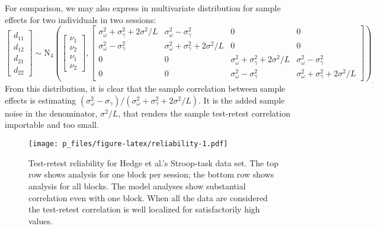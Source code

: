 \documentclass[english,man]{apa6}
\theoremstyle{definition}
\theoremstyle{definition}
\theoremstyle{definition}
\theoremstyle{remark}
\begin{document}
For comparison, we may also express in multivariate distribution for
sample effects for two individuals in two sessions: \[
\begin{bmatrix} d_{11} \\ d_{12} \\ d_{21} \\ d_{22} \end{bmatrix}
\sim \mbox{N}_4\left(
\begin{bmatrix} \nu_1 \\ \nu_2 \\ \nu_1 \\ \nu_2 \end{bmatrix},
\begin{bmatrix} 
\sigma^2_\omega+\sigma^2_\gamma +2\sigma^2/L& \sigma^2_\omega-\sigma^2_\gamma & 0 & 0\\ 
\sigma^2_\omega-\sigma^2_\gamma & \sigma^2_\omega+\sigma^2_\gamma + 2\sigma^2/L& 0 & 0\\
0 & 0 &\sigma^2_\omega+\sigma^2_\gamma + 2\sigma^2/L& \sigma^2_\omega-\sigma^2_\gamma \\ 
0 & 0 & \sigma^2_\omega-\sigma^2_\gamma & \sigma^2_\omega+\sigma^2_\gamma + 2\sigma^2/L
\end{bmatrix}
\right)_.
\] From this distribution, it is clear that the sample correlation
between sample effects is estimating
\((\sigma^2_\omega-\sigma_\gamma)/(\sigma^2_\omega+\sigma^2_\gamma+2\sigma^2/L)\).
It is the added sample noise in the denominator, \(\sigma^2/L\), that
renders the sample test-retest correlation importable and too small.

\begin{figure}[htbp]
\centering
\texttt{[image: p\_files/figure-latex/reliability-1.pdf]}
\caption{\label{fig:reliability}Test-retest reliability for Hedge et al.'s
Stroop-task data set. The top row shows analysis for one block per
session; the bottom row shows analysis for all blocks. The model
analyses show substantial correlation even with one block. When all the
data are considered the test-retest correlation is well localized for
satisfactorily high values.}
\end{figure}
\end{document}
